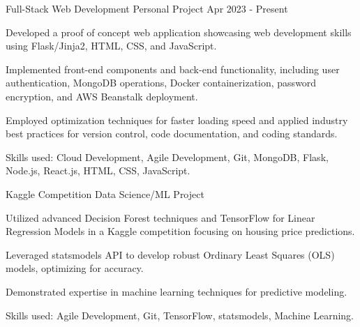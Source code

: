 
\begin{cventries}

  \cventry
    {Full-Stack Web Development} %
    {Personal Project} %
    {Apr 2023 - Present} %
    {} %
    {
      \begin{cvitems} %
        \item {Developed a proof of concept web application showcasing web development skills using Flask/Jinja2, HTML, CSS, and JavaScript.}
        \item {Implemented front-end components and back-end functionality, including user authentication, MongoDB operations, Docker containerization, password encryption, and AWS Beanstalk deployment.}
        \item {Employed optimization techniques for faster loading speed and applied industry best practices for version control, code documentation, and coding standards.}
        \item {Skills used: Cloud Development, Agile Development, Git, MongoDB, Flask, Node.js, React.js, HTML, CSS, JavaScript.}
      \end{cvitems}
    }

  \cventry
    {Kaggle Competition} %
    {Data Science/ML Project} %
    {} %
    {} %
    {
      \begin{cvitems} %
        \item {Utilized advanced Decision Forest techniques and TensorFlow for Linear Regression Models in a Kaggle competition focusing on housing price predictions.}
        \item {Leveraged statsmodels API to develop robust Ordinary Least Squares (OLS) models, optimizing for accuracy.}
        \item {Demonstrated expertise in machine learning techniques for predictive modeling.}
        \item {Skills used: Agile Development, Git, TensorFlow, statsmodels, Machine Learning.}
      \end{cvitems}
    }

\end{cventries}
